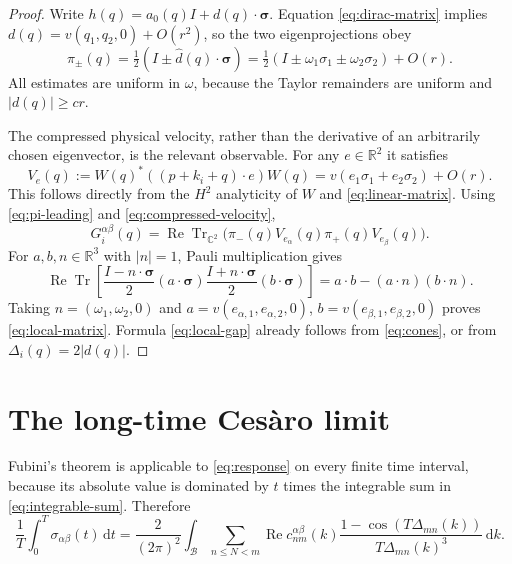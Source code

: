 \documentclass[11pt,a4paper]{article}
\numberwithin{equation}{section}
\newcommand{\R}{\mathbb R}
\newcommand{\C}{\mathbb C}
\newcommand{\cB}{\mathcal B}
\newcommand{\dd}{\,\mathrm d}
\DeclareMathOperator{\Tr}{Tr}
\DeclareMathOperator{\Rea}{Re}
\theoremstyle{remark}
\begin{document}
\begin{proof}
Write $h(q)=a_0(q)I+d(q)\cdot\boldsymbol\sigma$.
Equation \eqref{eq:dirac-matrix} implies
$d(q)=v(q_1,q_2,0)+O(r^2)$, so the two eigenprojections obey
\begin{equation}\label{eq:pi-leading}
 \pi_\pm(q)=\tfrac12(I\pm\widehat d(q)\cdot\boldsymbol\sigma)
   =\tfrac12(I\pm\omega_1\sigma_1\pm\omega_2\sigma_2)+O(r).
\end{equation}
All estimates are uniform in $\omega$, because the Taylor remainders
are uniform and $|d(q)|\geq cr$.

The compressed physical velocity, rather than the derivative of an
arbitrarily chosen eigenvector, is the relevant observable. For any
$e\in\R^2$ it satisfies
\begin{equation}\label{eq:compressed-velocity}
 V_e(q):=W(q)^*((p+k_i+q)\cdot e)W(q)
       =v(e_1\sigma_1+e_2\sigma_2)+O(r).
\end{equation}
This follows directly from the $H^2$ analyticity of $W$ and
\eqref{eq:linear-matrix}.
Using \eqref{eq:pi-leading} and \eqref{eq:compressed-velocity},
\[
 G_i^{\alpha\beta}(q)
     =\Rea\Tr_{\C^2}\bigl(\pi_-(q)V_{e_\alpha}(q)
                              \pi_+(q)V_{e_\beta}(q)\bigr).
\]
For $a,b,n\in\R^3$ with $|n|=1$, Pauli multiplication gives
\begin{equation}\label{eq:pauli-trace}
 \Rea\Tr\!\left[
     \frac{I-n\cdot\boldsymbol\sigma}{2}(a\cdot\boldsymbol\sigma)
     \frac{I+n\cdot\boldsymbol\sigma}{2}(b\cdot\boldsymbol\sigma)
             \right]
       =a\cdot b-(a\cdot n)(b\cdot n).
\end{equation}
Taking $n=(\omega_1,\omega_2,0)$ and
$a=v(e_{\alpha,1},e_{\alpha,2},0)$,
$b=v(e_{\beta,1},e_{\beta,2},0)$ proves
\eqref{eq:local-matrix}. Formula \eqref{eq:local-gap} already follows
from \eqref{eq:cones}, or from $\Delta_i(q)=2|d(q)|$.
\end{proof}

\section{The long-time Ces\`aro limit}

Fubini's theorem is applicable to \eqref{eq:response} on every finite
time interval, because its absolute value is dominated by $t$ times
the integrable sum in \eqref{eq:integrable-sum}. Therefore
\begin{equation}\label{eq:averaged-response}
 \frac1T\int_0^T\sigma_{\alpha\beta}(t)\dd t
   =\frac{2}{(2\pi)^2}\int_{\cB}
       \sum_{n\leq N<m}\Rea c_{nm}^{\alpha\beta}(k)
       \frac{1-\cos(T\Delta_{mn}(k))}
            {T\Delta_{mn}(k)^3}\dd k.
\end{equation}
\end{document}
